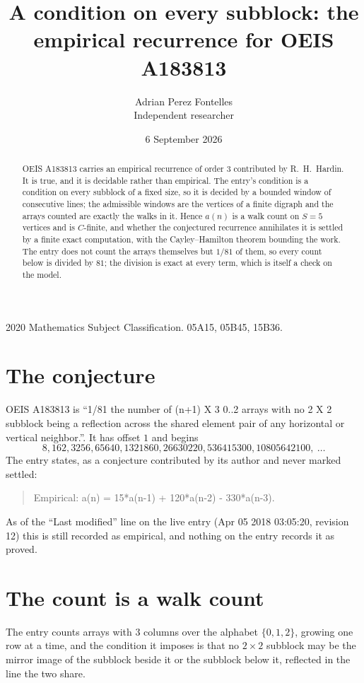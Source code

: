 \documentclass[11pt,a4paper]{article}
\title{A condition on every subblock: the empirical recurrence for OEIS A183813}
\author{Adrian Perez Fontelles\\ \small Independent researcher}
\date{6 September 2026}
\theoremstyle{plain}
\theoremstyle{definition}
\begin{document}
\maketitle

\begin{abstract}
OEIS A183813 carries an empirical recurrence of order $3$ contributed by R.~H.~Hardin. It is
true, and it is decidable rather than empirical. The entry's condition is a condition on every
subblock of a fixed size, so it is decided by a bounded window of consecutive lines; the
admissible windows are the vertices of a finite digraph and the arrays counted are exactly the
walks in it. Hence $a(n)$ is a walk count on $S=5$ vertices and is $C$-finite, and whether the
conjectured recurrence annihilates it is settled by a finite exact computation, with the
Cayley--Hamilton theorem bounding the work. The entry does not count the arrays themselves but $1/81$ of them, so every count below is divided by $81$; the division is exact at every term, which is itself a check on the model.
\end{abstract}

\noindent\small 2020 Mathematics Subject Classification. 05A15, 05B45, 15B36.\normalsize

\section{The conjecture}

OEIS A183813 is ``1/81 the number of (n+1) X 3 0..2 arrays with no 2 X 2 subblock being a reflection across the shared element pair of any horizontal or vertical neighbor.''. It has offset $1$ and begins
\[
8, 162, 3256, 65640, 1321860, 26630220, 536415300, 10805642100,\ \dots
\]
The entry states, as a conjecture contributed by its author and never marked settled:
\begin{quote}
Empirical: a(n) = 15*a(n-1) + 120*a(n-2) - 330*a(n-3).
\end{quote}
As of the ``Last modified'' line on the live entry (Apr 05 2018 03:05:20, revision 12) this is still
recorded as empirical, and nothing on the entry records it as proved.

\section{The count is a walk count}

The entry counts arrays with $3$ columns over the alphabet $\{0,1,2\}$, growing one row at a time, and the condition it imposes is that no $2\times2$ subblock may be the mirror image of the subblock beside it or the subblock below it, reflected in the line the two share.
\end{document}
